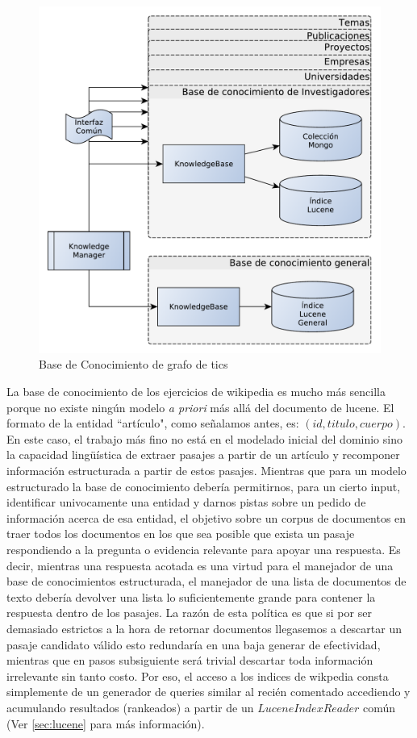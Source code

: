 \begin{figure}
  \centering
    \includegraphics[scale=0.5]{graficos/KnowledgeManager}
  \caption{Base de Conocimiento de grafo de tics}
  \label{fig:KnowledgeManager}
\end{figure}

La base de conocimiento de los ejercicios de wikipedia es mucho más sencilla 
porque no existe ningún modelo \emph{a priori} más allá del documento de lucene.
El formato de la entidad ``artículo", como señalamos antes, es: $(id, titulo, cuerpo)$. 
En este caso, el trabajo más fino no está en el modelado inicial del dominio 
sino la capacidad lingüística de extraer pasajes a partir de un artículo y recomponer información
estructurada a partir de estos pasajes. Mientras que para un modelo estructurado la base de conocimiento
debería permitirnos, para un cierto input, identificar univocamente una entidad y darnos pistas sobre un pedido de
información acerca de esa entidad, el objetivo sobre un corpus de documentos en 
traer todos los documentos en los que sea posible que exista un pasaje respondiendo a la pregunta o
evidencia relevante para apoyar una respuesta. Es decir, mientras una respuesta acotada es una virtud para
el manejador de una base de conocimientos estructurada, el manejador de una lista de documentos de texto debería devolver
una lista lo suficientemente grande para contener la respuesta dentro de los pasajes. La razón de esta política es que si
por ser demasiado estrictos a la hora de retornar documentos llegasemos a descartar un pasaje candidato válido esto
redundaría en una baja generar de efectividad, mientras que en pasos subsiguiente será trivial descartar toda información irrelevante
sin tanto costo. Por eso, el acceso a los indices de wikpedia consta simplemente de un generador de queries similar al recién comentado
accediendo y acumulando resultados (rankeados) a partir de un $LuceneIndexReader$ común (Ver \ref{sec:lucene} para más información).


